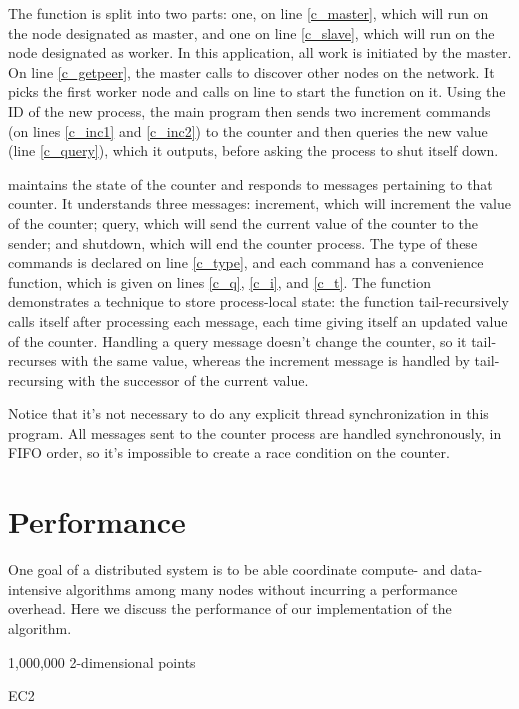 \documentclass[preprint]{sigplanconf}
\begin{document}
The  function is split into two parts: one, on line \ref{c_master}, which will run on the node designated as master, and one on line \ref{c_slave}, which will run on the node designated as worker. In this application, all work is initiated by the master. On line \ref{c_getpeer}, the master calls  to discover other nodes on the network. It picks the first worker node and calls  on line to start the  function on it. Using the ID of the new process, the main program then sends two increment commands (on lines \ref{c_inc1} and \ref{c_inc2}) to the counter and then queries the new value (line \ref{c_query}), which it outputs, before asking the process to shut itself down.

 maintains the state of the counter and responds to messages pertaining to that counter. It understands three messages: increment, which will increment the value of the counter; query, which will send the current value of the counter to the sender; and shutdown, which will end the counter process. The type of these commands is declared on line \ref{c_type}, and each command has a convenience function, which is given on lines \ref{c_q}, \ref{c_i}, and \ref{c_t}. The  function demonstrates a technique to store process-local state: the function tail-recursively calls itself after processing each message, each time giving itself an updated value of the counter. Handling a query message doesn't change the counter, so it tail-recurses with the same value, whereas the increment message is handled by tail-recursing with the successor of the current value.

Notice that it's not necessary to do any explicit thread synchronization in this program. All messages sent to the counter process are handled synchronously, in FIFO order, so it's impossible to create a race condition on the counter.

\section{Performance}

One goal of a distributed system is to be able coordinate compute- and data-intensive algorithms among many nodes without incurring a performance overhead. Here we discuss the performance of our implementation of the \kmeans algorithm.

1,000,000 2-dimensional points

EC2
\end{document}
